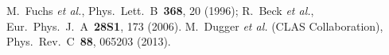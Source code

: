 \documentclass[aps,prc,twocolumn,floatfix,showpacs,preprintnumbers,amsmath,amssymb,superscriptaddress]{revtex4-1}
\begin{document}
\begin{thebibliography}{99}
M.~Fuchs \textit{et al.}, Phys.\ Lett.\ B\ 
	\textbf{368}, 20 (1996); 
	R.~Beck \textit{et al.}, Eur.\ Phys.\ J.\ A\ \textbf{28S1}, 
	173 (2006).
 M.~Dugger \textit{et al.} (CLAS Collaboration), 
	Phys.\ Rev.\ C\ \textbf{88}, 065203 (2013).
\end{thebibliography}
\end{document}
